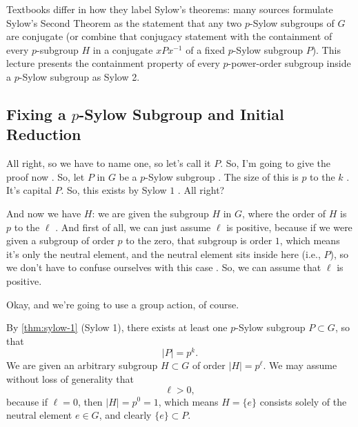 \begin{aiNote}
Textbooks differ in how they label Sylow's theorems: many sources formulate Sylow's Second Theorem as the statement that any two $p$-Sylow subgroups of $G$ are conjugate (or combine that conjugacy statement with the containment of every $p$-subgroup $H$ in a conjugate $x P x^{-1}$ of a fixed $p$-Sylow subgroup $P$). This lecture presents the containment property of every $p$-power-order subgroup inside a $p$-Sylow subgroup as Sylow 2.
\end{aiNote}

\begin{proofWrapper}

\subsection{Fixing a \texorpdfstring{$p$}{p}-Sylow Subgroup and Initial Reduction}

\begin{speech}[00:19:58 - 00:21:07]
All right, so we have to name one, so let's call it $P$. So, I'm going to give the proof now . So, let $P$ in $G$ be a $p$-Sylow subgroup . The size of this is $p$ to the $k$ . It's capital $P$. So, this exists by Sylow $1$ . All right?

And now we have $H$: we are given the subgroup $H$ in $G$, where the order of $H$ is $p$ to the $\ell$ . And first of all, we can just assume $\ell$ is positive, because if we were given a subgroup of order $p$ to the zero, that subgroup is order $1$, which means it's only the neutral element, and the neutral element sits inside here (i.e., $P$), so we don't have to confuse ourselves with this case . So, we can assume that $\ell$ is positive.

Okay, and we're going to use a group action, of course.
\end{speech}

\begin{content}
By \cref{thm:sylow-1} (Sylow 1), there exists at least one $p$-Sylow subgroup $P \subset G$, so that
\[
|P| = p^k.
\]
We are given an arbitrary subgroup $H \subset G$ of order $|H| = p^\ell$. We may assume without loss of generality that
\[
\ell > 0,
\]
because if $\ell = 0$, then $|H| = p^0 = 1$, which means $H = \{e\}$ consists solely of the neutral element $e \in G$, and clearly $\{e\} \subset P$.
\end{content}


\end{proofWrapper}
